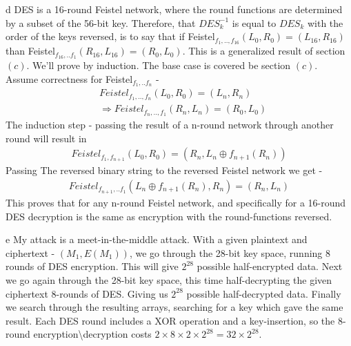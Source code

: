 \documentclass{article}
\begin{document}
\begin{paragraph}
	d DES is a 16-round Feistel network, where the round functions are determined
	by a subset of the 56-bit key. Therefore, that $DES_k^{-1}$ is equal to
	$DES_k$ with the order of the keys reversed, is to say that if Feistel$_{f_1,..,f_{16}}(L_0, R_0) = (L_{16},R_{16})$ than 
	Feistel$_{f_{16},..f_1}(R_{16},L_{16}) = (R_0, L_0)$. This is a generalized result of
	section $(c)$. We'll prove by induction. The base case is covered be section
	$(c)$. Assume correctness for Feistel$_{f_1,..f_n}$ - 
	\begin{align*}
		&Feistel_{f_1,..,f_n}(L_0,R_0) = (L_n,R_n) \\
		&\Rightarrow Feistel_{f_n,..,f_1}(R_n,L_n) = (R_0, L_0)
	\end{align*}
	The induction step - passing the result of a n-round network through another round
	will result in
	\begin{align*}
		Feistel_{f_1,f_{n+1}}(L_0,R_0) = (R_n, L_n\oplus f_{n+1}(R_n))
	\end{align*}
	Passing The reversed binary string to the reversed Feistel network we get - 
	\begin{align*}
		Feistel_{f_{n+1},..f_1}(L_n\oplus f_{n+1}(R_n),R_n) = (R_n,L_n)
	\end{align*}
	This proves that for any n-round Feistel network, and specifically for a 16-round DES
	decryption is the same as encryption with the round-functions reversed.
\end{paragraph}

\begin{paragraph}
	e My attack is a meet-in-the-middle attack. With a given plaintext and ciphertext -
	$(M_1, E(M_1))$, we go through the 28-bit key space, running 8 rounds of
	DES encryption. This will give $2^{28}$ possible half-encrypted data. Next we go again
	through the 28-bit key space, this time half-decrypting the given ciphertext 8-rounds
	of DES. Giving us $2^{28}$ possible half-decrypted data. Finally we search through the 
	resulting arrays, searching for a key which gave the same result. Each DES round includes
	a XOR operation and a key-insertion, so the 8-round encryption\textbackslash decryption
	costs $2\times 8 \times 2 \times 2^{28} = 32\times 2^{28}$.
\end{paragraph}
\end{document}
